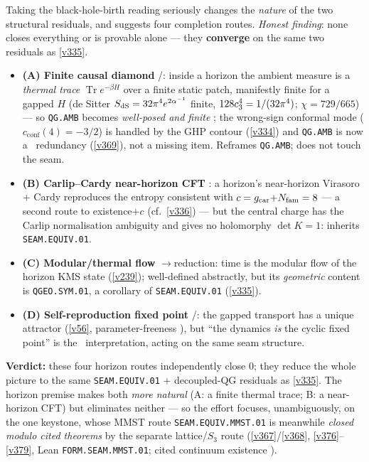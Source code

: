 \begin{keybox}
Taking the black-hole-birth reading seriously changes the \emph{nature} of the two structural residuals, and
suggests four completion routes. \emph{Honest finding}: none closes everything or is provable alone --- they
\textbf{converge} on the same two residuals as \vref{v335}.
\begin{itemize}\setlength\itemsep{1pt}
\item \textbf{(A) Finite causal diamond} \mE/\mO: inside a horizon the ambient measure is a \emph{thermal trace}
$\operatorname{Tr}e^{-\beta H}$ over a finite static patch, manifestly finite for a gapped $H$ (de Sitter
$S_{\mathrm{dS}}=32\pi^4 e^{2\alpha^{-1}}$ finite, $128c_3^4=1/(32\pi^4)$; $\chi=729/665$) --- so \texttt{QG.AMB}
becomes \emph{well-posed and finite} \mE; the wrong-sign conformal mode ($c_{\mathrm{conf}}(4)=-3/2$) is handled by
the GHP contour (\vref{v334}) and \texttt{QG.AMB} is now a \mC\ redundancy (\vref{v369}), not a missing item.
Reframes \texttt{QG.AMB}; does not touch the seam.
\item \textbf{(B) Carlip--Cardy near-horizon CFT} \mC: a horizon's near-horizon Virasoro $+$ Cardy reproduces the
entropy consistent with $c=g_{\mathrm{car}}{+}N_{\mathrm{fam}}=8$ --- a second route to existence$+c$ (cf.\ \vref{v336}) --- but the
central charge has the Carlip normalisation ambiguity and gives no holomorphy $\det K{=}1$: inherits
\texttt{SEAM.EQUIV.01}.
\item \textbf{(C) Modular/thermal flow} \mE$\to$reduction: time is the modular flow of the horizon KMS state
(\vref{v239}); well-defined abstractly, but its \emph{geometric} content is \texttt{QGEO.SYM.01}, a corollary of
\texttt{SEAM.EQUIV.01} (\vref{v335}).
\item \textbf{(D) Self-reproduction fixed point} \mE/\mO: the gapped transport has a unique attractor (\vref{v56},
parameter-freeness \mE), but ``the dynamics \emph{is} the cyclic fixed point'' is the \mC\ interpretation, acting
on the same seam structure.
\end{itemize}
\textbf{Verdict:} these four horizon routes independently close $0$; they reduce the whole picture to the same
\texttt{SEAM.EQUIV.01} $+$ decoupled-QG residuals as \vref{v335}. The horizon premise makes both \emph{more
natural} (A: a finite thermal trace; B: a near-horizon CFT) but eliminates neither --- so the effort focuses,
unambiguously, on the one keystone, whose MMST route \texttt{SEAM.EQUIV.MMST.01} is meanwhile \emph{closed modulo
cited theorems} by the separate
lattice/$S_3$ route (\vref{v367}/\vref{v368}, \vref{v376}--\vref{v379}, Lean \texttt{FORM.SEAM.MMST.01}; cited
continuum existence \mO).
\end{keybox}

